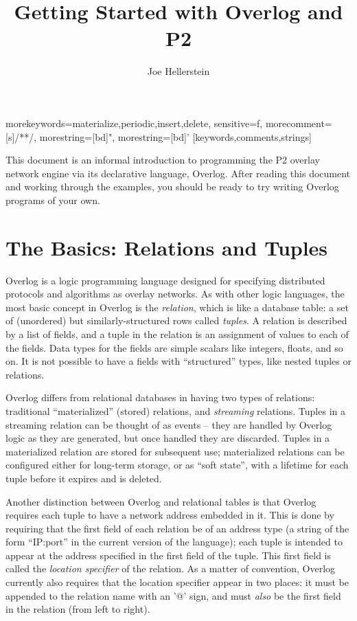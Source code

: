 \documentclass{article}
\title{Getting Started with Overlog and P2}
\author{Joe Hellerstein}
\begin{document}
\date{}
\maketitle

%
  {morekeywords={materialize,periodic,insert,delete},%
   sensitive=f,%
   morecomment=[s]{/*}{*/},%
   morestring=[bd]",%
   morestring=[bd]'%
  }[keywords,comments,strings]%



This document is an informal introduction to programming the P2
overlay network engine via its declarative language, Overlog.  After
reading this document and working through the examples, you should
be ready to try writing Overlog programs of your own.

\section{The Basics: Relations and Tuples}
Overlog is a logic programming language designed for specifying
distributed protocols and algorithms as overlay networks.  As with
other logic languages, the most basic concept in Overlog is the {\em
  relation}, which is like a database table: a set of
(unordered) but similarly-structured rows called {\em tuples}.  A
relation is described by a list of fields, and a tuple in the
relation is an assignment of values to each of the fields.  Data types
for the fields are simple scalars like integers, floats, and so on. It
is not possible to have a fields with ``structured'' types, like
nested tuples or relations.

Overlog differs from relational databases in having two types of
relations: traditional ``materialized'' (stored) relations, and
{\em streaming} relations.  Tuples in a streaming relation can be thought of
as events -- they are handled by Overlog logic as they are generated,
but once handled they are discarded.  Tuples in a materialized
relation are stored for subsequent use; materialized relations can be
configured either for long-term storage, or as ``soft state'', with a
lifetime for each tuple before it expires and is deleted.

Another distinction between Overlog and relational tables is that
Overlog requires each tuple to have a network address embedded in it.
This is done by requiring that the first field of each relation be of
an address type (a string of the form ``IP:port'' in the current
version of the language); each tuple is intended to appear at the
address specified in the first field of the tuple.  This first field
is called the {\em location specifier} of the relation.  As a matter
of convention, Overlog currently also requires that the location
specifier appear in two places: it must be appended to the relation
name with an '@' sign, and must {\em also} be the first field in the
relation (from left to right).
\end{document}
